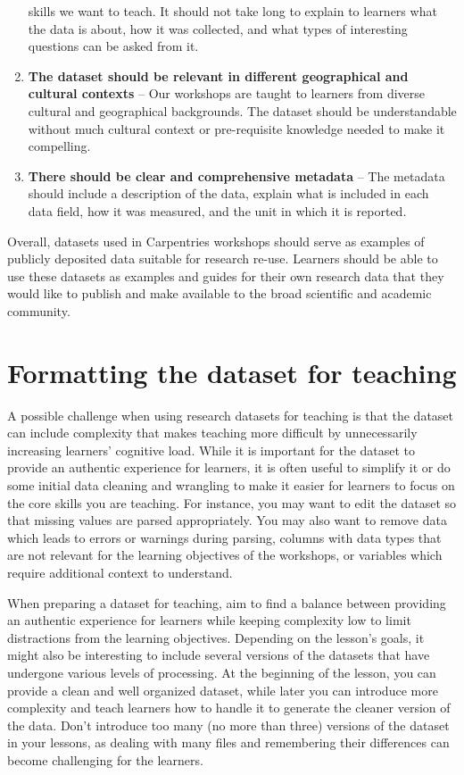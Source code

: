 \documentclass[]{book}
\begin{document}
\begin{enumerate}
  skills we want to teach. It should not take long to explain to learners what the data is about,
  how it was collected, and what types of interesting questions can be asked from it.
\item
  \textbf{The dataset should be relevant in different geographical and cultural contexts} -- Our
  workshops are taught to learners from diverse cultural and geographical backgrounds. The
  dataset should be
  understandable without much cultural context or pre-requisite knowledge needed
  to make it compelling.
\item
  \textbf{There should be clear and comprehensive metadata} -- The metadata should include a
  description of the data, explain what is included in each data field, how it was measured,
  and the unit in which it is reported.
\end{enumerate}

Overall, datasets used in Carpentries workshops should serve as examples of publicly
deposited
data suitable for research re-use. Learners should be able to use these datasets as examples
and guides for their own research data that they would like to publish and make available to
the broad scientific and academic community.

\hypertarget{formatting-the-dataset-for-teaching}{%
\section{Formatting the dataset for teaching}\label{formatting-the-dataset-for-teaching}}

A possible challenge when using research datasets for teaching is that the dataset can
include complexity that makes teaching more difficult by unnecessarily increasing
learners' cognitive load. While it is important for the dataset to
provide an authentic experience for learners, it is often useful to simplify it or
do some initial data cleaning and wrangling to make it easier for learners
to focus on the core skills you are teaching. For instance, you
may want to edit the dataset so that missing values are parsed appropriately.
You may also want to remove data which leads to errors or warnings during parsing,
columns with data types
that are not relevant for the learning objectives of the workshops, or variables which
require additional context to understand.

When preparing a dataset for teaching, aim to find a balance between providing an
authentic experience for learners while keeping complexity low to limit distractions from the
learning objectives. Depending on the lesson's goals, it might also be interesting to
include several versions of the datasets that have undergone various levels of processing.
At the beginning of the lesson, you can provide a clean and well organized dataset, while
later you can introduce more complexity and teach learners how to handle it to generate the cleaner
version of the data. Don't introduce too many (no more than three) versions of the dataset in
your lessons, as dealing with many files and remembering their differences can become
challenging for the learners.
\end{document}
